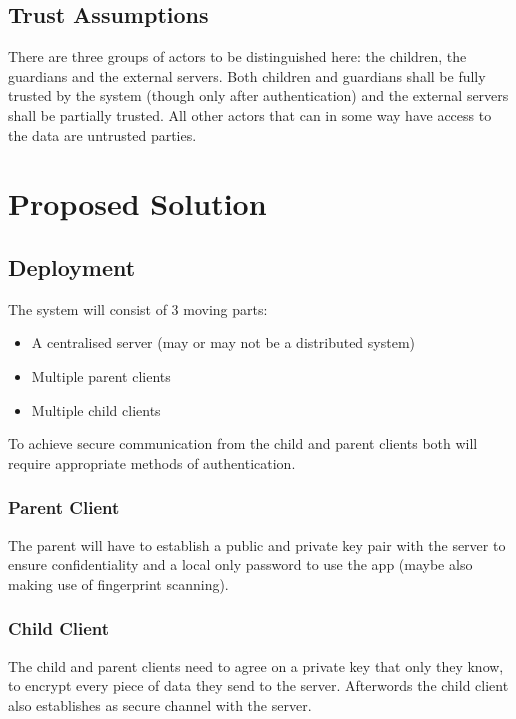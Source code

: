 \documentclass[a4paper]{article}
\begin{document}
\subsection{Trust Assumptions}
There are three groups of actors to be distinguished here: the children, the guardians and the external servers. Both children and guardians shall be fully trusted by the system (though only after authentication) and the external servers shall be partially trusted. All other actors that can in some way have access to the data are untrusted parties.

\section{Proposed Solution}

\subsection{Deployment}

The system will consist of 3 moving parts:

\begin{itemize}
    \item A centralised server (may or may not be a distributed system)
    \item Multiple parent clients
    \item Multiple child clients
\end{itemize}

To achieve secure communication from the child and parent clients both will require appropriate methods
of authentication.

\subsubsection{Parent Client}
The parent will have to establish a public and private key pair with the server to ensure confidentiality
and a local only password to use the app (maybe also making use of fingerprint scanning).

\subsubsection{Child Client}
The child and parent clients need to agree on a private key that only they know, to encrypt every piece of
data they send to the server. Afterwords the child client also establishes as secure channel with the server.
\end{document}
